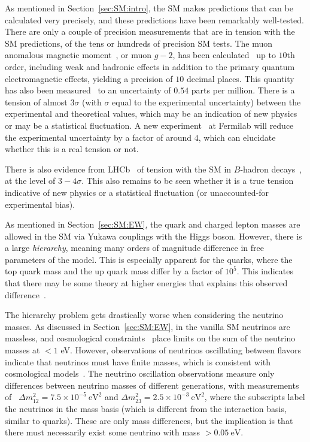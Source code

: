 As mentioned in Section~\ref{sec:SM:intro}, the SM makes predictions that can be calculated very precisely, and these predictions have been remarkably well-tested.
There are only a couple of precision measurements that are in tension with the SM predictions, of the tens or hundreds of precision SM tests.
The muon anomalous magnetic moment~\cite{Blum:2013xva}, or muon $g-2$, has been calculated~\cite{Aoyama:2012wk} up to $10$th order, including weak and hadronic effects in addition to the primary quantum electromagnetic effects, yielding a precision of $10$ decimal places.
This quantity has also been measured~\cite{Bennett:2006fi} to an uncertainty of $0.54$ parts per million.
There is a tension of almost $3\sigma$ (with $\sigma$ equal to the experimental uncertainty) between the experimental and theoretical values, which may be an indication of new physics or may be a statistical fluctuation.
A new experiment~\cite{Chapelain:2017syu} at Fermilab will reduce the experimental uncertainty by a factor of around $4$, which can elucidate whether this is a real tension or not.

There is also evidence from LHCb~\cite{Alves:2008zz} of tension with the SM in $B$-hadron decays~\cite{Capdevila:2017bsm}, at the level of $3-4\sigma$.
This also remains to be seen whether it is a true tension indicative of new physics or a statistical fluctuation (or unaccounted-for experimental bias).

As mentioned in Section~\ref{sec:SM:EW}, the quark and charged lepton masses are allowed in the SM via Yukawa couplings with the Higgs boson.
However, there is a large \textit{hierarchy}, meaning many orders of magnitude difference in free parameters of the model.
This is especially apparent for the quarks, where the top quark mass and the up quark mass differ by a factor of $10^5$. 
This indicates that there may be some theory at higher energies that explains this observed difference~\cite{Xing:2014sja}.

The hierarchy problem gets drastically worse when considering the neutrino masses.
As discussed in Section~\ref{sec:SM:EW}, in the vanilla SM neutrinos are massless, and cosmological constraints~\cite{Ade:2013zuv} place limits on the sum of the neutrino masses at $<1$ eV.
However, observations of neutrinos oscillating between flavors~\cite{Fukuda:1998mi} indicate that neutrinos must have finite masses, which is consistent with cosmological models~\cite{Battye:2013xqa}.
The neutrino oscillation observations measure only differences between neutrino masses of different generations, with measurements of~\cite{Araki:2004mb,Evans:2013pka,PDG} $\Delta m_{12}^2=7.5\times10^{-5}~\text{eV}^2$ and $\Delta m_{23}^2=2.5\times10^{-3}~\text{eV}^2$, where the subscripts label the neutrinos in the mass basis (which is different from the interaction basis, similar to quarks).
These are only mass differences, but the implication is that there must necessarily exist some neutrino with mass $>0.05~\text{eV}$.


